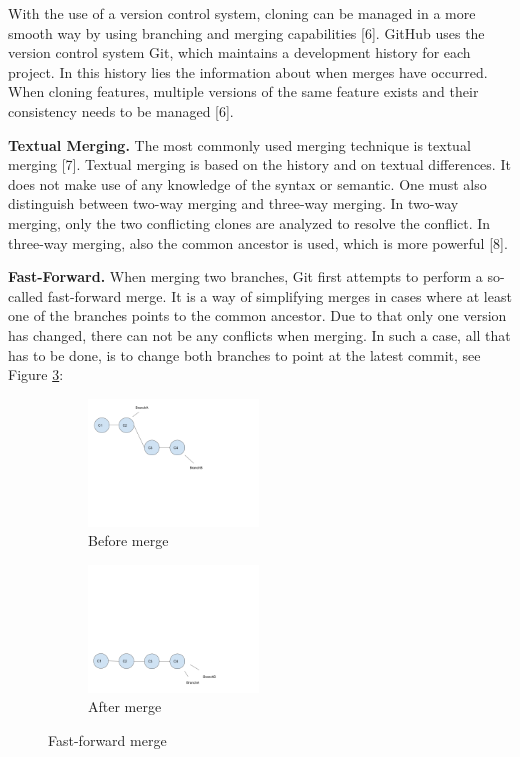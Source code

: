 With the use of a version control system, cloning can be managed in a more smooth way by using branching and merging capabilities [6]. GitHub uses the version control system Git, which maintains a development history for each project. In this history lies the information about when merges have occurred. When cloning features, multiple versions of the same feature exists and their consistency needs to be managed [6].

\textbf{Textual Merging.} The most commonly used merging technique is textual merging [7]. Textual merging is based on the history and on textual differences. It does not make use of any knowledge of the syntax or semantic. One must also distinguish between two-way merging and three-way merging. In two-way merging, only the two conflicting clones are analyzed to resolve the conflict. In three-way merging, also the common ancestor is used, which is more powerful [8].

\textbf{Fast-Forward.} When merging two branches, Git first attempts to perform a so-called fast-forward merge. It is a way of simplifying merges in cases where at least one of the branches points to the common ancestor. Due to that only one version has changed, there can not be any conflicts when merging. In such a case, all that has to be done, is to change both branches to point at the latest commit, see Figure \ref{fig:fastforward}:
\begin{figure}[h]
  \centering
  \begin{subfigure}[b]{0.3\textwidth}
      \includegraphics[width=128pt]{figure/ff1.png}
      \caption{Before merge}
      \label{fig:fbranch1}
  \end{subfigure}
  \begin{subfigure}[b]{0.3\textwidth}
      \includegraphics[width=128pt]{figure/ff2.png}
      \caption{After merge}
      \label{fig:fbranch3}
  \end{subfigure}
  \caption{Fast-forward merge}\label{fig:fastforward}
\end{figure}

